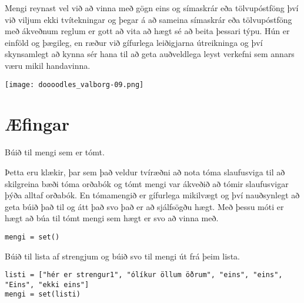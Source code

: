 Mengi reynast vel við að vinna með gögn eins og símaskrár eða tölvupóstföng því við viljum ekki tvítekningar og þegar á að sameina símaskrár eða tölvupóstföng með ákveðnum reglum er gott að vita að hægt sé að beita þessari týpu.
Hún er einföld og þægileg, en ræður við gífurlega leiðigjarna útreikninga og því skynsamlegt að kynna sér hana til að geta auðveldlega leyst verkefni sem annars væru mikil handavinna.

	\begin{center}
		\texttt{[image: doooodles\_valborg-09.png]}
	\end{center}

\newpage
\section{Æfingar}
\begin{exercise}\label{set1}
Búið til mengi sem er tómt.
\end{exercise}
\begin{Answer}[ref={set1}]
Þetta eru klækir, þar sem það veldur tvíræðni að nota tóma slaufusviga til að skilgreina bæði tóma orðabók og tómt mengi var ákveðið að tómir slaufusvigar þýða alltaf orðabók.
En tómamengið er gífurlega mikilvægt og því nauðsynlegt að geta búið það til og átt það svo það er að sjálfsögðu hægt.
Með þessu móti er hægt að búa til tómt mengi sem hægt er svo að vinna með.
	\begin{lstlisting}
mengi = set()
	\end{lstlisting}
\end{Answer}


\begin{exercise}\label{set2}
Búið til lista af strengjum og búið svo til mengi út frá þeim lista.
\end{exercise}
\begin{Answer}[ref={set2}]
	
	\begin{lstlisting}
listi = ["hér er strengur1", "ólíkur öllum öðrum", "eins", "eins", "Eins", "ekki eins"]
mengi = set(listi)\end{lstlisting}
\end{Answer}


